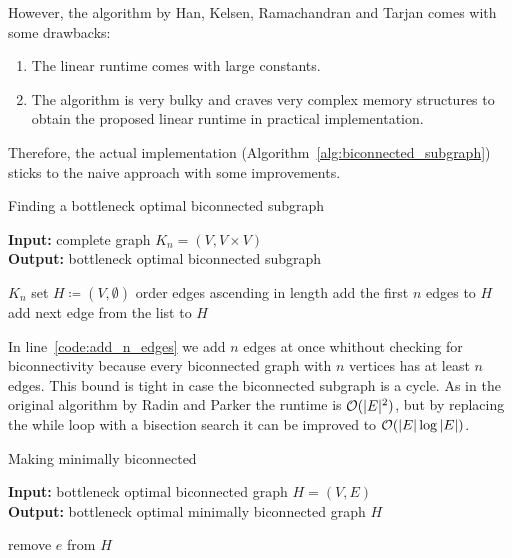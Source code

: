 However, the algorithm by Han, Kelsen, Ramachandran and Tarjan comes with some drawbacks:
\begin{enumerate}
  \item The linear runtime comes with large constants.
  \item The algorithm is very bulky and craves very complex memory structures to obtain the proposed linear runtime in practical implementation.
\end{enumerate}

Therefore, the actual implementation (Algorithm~\ref{alg:biconnected_subgraph}) sticks to the naive approach with some improvements.

\begin{algorithm}[ht!]
  \caption{Finding a bottleneck optimal biconnected subgraph}\label{alg:biconnected_subgraph}
  \textbf{Input:} complete graph \(K_n = (V, V \times V)\)\\
  \textbf{Output:} bottleneck optimal biconnected subgraph
  \begin{algorithmic}[1]
     {$K_n$}
      \State set \(H \coloneqq (V, \emptyset)\)
      \State order edges ascending in length
      \State add the first \(n\) edges to \(H\)\label{code:add_n_edges}
        \State add next edge from the list to \(H\)
      \EndWhile
      \State{}
    \EndProcedure
  \end{algorithmic}
\end{algorithm}

In line~\ref{code:add_n_edges} we add \(n\) edges at once whithout checking for biconnectivity because every biconnected graph with \(n\) vertices has at least \(n\) edges. This bound is tight in case the biconnected subgraph is a cycle. As in the original algorithm by Radin and Parker the runtime is \(\mathcal{O}(\vert E \vert^2)\), but by replacing the while loop with a bisection search it can be improved to \(\mathcal{O}(\vert E \vert\log \vert E \vert)\).

\begin{algorithm}[ht!]
  \caption{Making minimally biconnected}\label{alg:minimally_biconnected}
  \textbf{Input: } bottleneck optimal biconnected graph \(H = (V, E)\)\\
  \textbf{Output: } bottleneck optimal minimally biconnected graph \(H\)
  \begin{algorithmic}[1]
          \State remove \(e\) from \(H\)
        \EndIf
      \EndFor
      \State {}
    \EndProcedure
  \end{algorithmic}
\end{algorithm}

